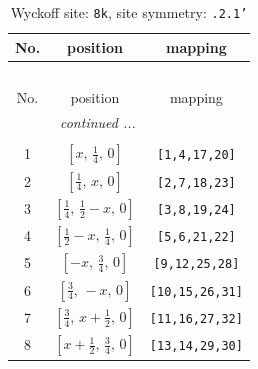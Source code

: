 \documentclass[fleqn,8pt]{jsarticle}
\begin{document}
\begin{longtable}{ccc}
\caption{Wyckoff site: {\tt 8k}, site symmetry: {\tt .2.1'}}
 \\
 \hline \hline
No. & position & mapping \\ \hline \endfirsthead

\multicolumn{2}{l}{\tablename\ \thetable{}} \\
 \hline \hline
No. & position & mapping \\ \hline \endhead

 \hline \hline
\multicolumn{2}{r}{\footnotesize\it continued ...} \\ \endfoot

 \hline \hline
\multicolumn{2}{r}{} \\ \endlastfoot

1 & $\left[ x,\, \frac{1}{4},\, 0 \right]$ & {\tt [1,4,17,20]} \\ \hline
2 & $\left[ \frac{1}{4},\, x,\, 0 \right]$ & {\tt [2,7,18,23]} \\ \hline
3 & $\left[ \frac{1}{4},\, \frac{1}{2} - x,\, 0 \right]$ & {\tt [3,8,19,24]} \\ \hline
4 & $\left[ \frac{1}{2} - x,\, \frac{1}{4},\, 0 \right]$ & {\tt [5,6,21,22]} \\ \hline
5 & $\left[ - x,\, \frac{3}{4},\, 0 \right]$ & {\tt [9,12,25,28]} \\ \hline
6 & $\left[ \frac{3}{4},\, - x,\, 0 \right]$ & {\tt [10,15,26,31]} \\ \hline
7 & $\left[ \frac{3}{4},\, x + \frac{1}{2},\, 0 \right]$ & {\tt [11,16,27,32]} \\ \hline
8 & $\left[ x + \frac{1}{2},\, \frac{3}{4},\, 0 \right]$ & {\tt [13,14,29,30]} \\
\end{longtable}
\renewcommand{\arraystretch}{1.2}
\end{document}
